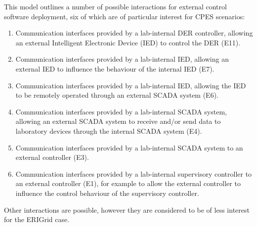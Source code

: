 \documentclass[runningheads,a4paper]{llncs}
\begin{document}
This model outlines a number of possible interactions for external control software deployment, six of which are of particular interest for CPES scenarios:

\begin{enumerate}
\item Communication interfaces provided by a lab-internal DER controller, allowing an external Intelligent Electronic Device (IED) to control the DER (E11). %
\item Communication interfaces provided by a lab-internal IED, allowing an external IED to influence the behaviour of the internal IED (E7).
\item Communication interfaces provided by a lab-internal IED, allowing the IED to be remotely operated through an external SCADA system (E6).
\item Communication interfaces provided by a lab-internal SCADA system, allowing an external SCADA system to receive and/or send data to laboratory devices through the internal SCADA system (E4).
\item Communication interfaces provided by a lab-internal SCADA system to an external controller (E3).
\item Communication interfaces provided by a lab-internal supervisory controller to an external controller (E1), for example to allow the external controller to influence the control behaviour of the supervisory controller.
\end{enumerate}

Other interactions are possible, however they are considered to be of less interest for the ERIGrid case. \\
\end{document}
